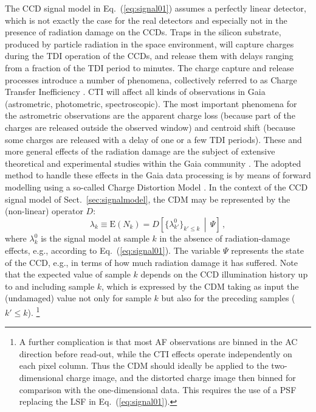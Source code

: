 \documentclass[structabstract]{aa}
\begin{document}
The CCD signal model in Eq.~(\ref{eq:signal01}) assumes a perfectly linear
detector, which is not exactly the case for the real detectors and especially not 
in the presence of radiation damage on the CCDs. Traps in the silicon substrate,
produced by particle radiation in the space environment, will capture charges
during the TDI operation of the CCDs, and release them with delays ranging
from a fraction of the TDI period to minutes. The charge capture and release
processes introduce a number of phenomena, collectively referred to as
Charge Transfer Inefficiency \citep[$\text{CTI}=1-\text{CTE}$, where CTE is
the Charge Transfer Efficiency;][]{2001sccd.book.....J}. CTI will affect all kinds of
observations in Gaia (astrometric, photometric, spectroscopic). The most 
important phenomena for the astrometric observations are the
apparent charge loss (because part of the charges are released outside the
observed window) and centroid shift (because some charges are released with
a delay of one or a few TDI periods). These and more general effects of the
radiation damage are the subject of extensive theoretical and experimental
studies within the Gaia community 
\citep[e.g.,][]{2009SPIE.7439E...3S,2010SPIE.7742E..29P,2011MNRAS.414.2215P}. 
The adopted method to
handle these effects in the Gaia data processing is by means of forward modelling   
using a so-called Charge Distortion Model \citep[CDM;][]{short2010}. In the context
of the CCD signal model of Sect.~\ref{sec:signalmodel}, the CDM may be represented 
by the (non-linear) operator $D$:
\begin{equation}
    \lambda_k \equiv \mbox{E}\left( N_k \right) = D\left[
    \bigl\{\lambda_{k'}^0\bigr\}_{k'\le k}\, \middle\vert \, \Psi\right] \, ,
    \label{eq:signal02}
\end{equation}
where $\lambda_{k}^0$ is the signal model at sample $k$ in the absence of 
radiation-damage effects, e.g., according to Eq.~(\ref{eq:signal01}). 
The variable $\Psi$ represents the state of the CCD, e.g., in terms of how
much radiation damage it has suffered. Note that the expected value of sample
$k$ depends on the CCD illumination history up to and including sample $k$,
which is expressed by the CDM taking as input the (undamaged) value
not only for sample $k$ but also for the preceding samples ($k'\le k$).%
\footnote{A further complication is that most AF observations are binned in the
AC direction before read-out, while the CTI effects operate independently on each
pixel column. Thus the CDM should ideally be applied to the two-dimensional
charge image, and the distorted charge image then binned for comparison with
the one-dimensional data. This requires the use of a PSF replacing the LSF
in Eq.~(\ref{eq:signal01}).} 
\end{document}
